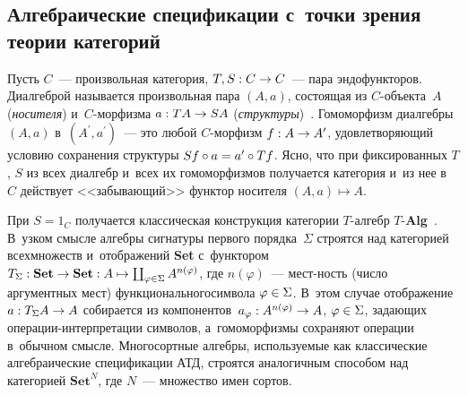 \begin{multicols}{2}
\vspace*{-6pt}

\section{Алгебраические спецификации с~точки зрения теории 
категорий}

\vspace*{-3pt}

  Пусть $C$~--- произвольная категория, $T, S : C\hm\to C$~--- пара 
эндофункторов. Ди\-ал\-геб\-рой называется произвольная пара $(A, a)$, со\-сто\-ящая 
из \mbox{$C$-объ}\-ек\-та~$A$ (\textit{носителя}) и~$C$-мор\-физ\-ма $a : TA\hm\to 
SA$ (\textit{структуры})~\cite{8-kov}. Гомоморфизм ди\-ал\-геб\-ры $(A, a)$ 
в~$(A^\prime, a^\prime)$~--- это любой $C$-мор\-физм $f : A\hm\to A^\prime$, 
удовле\-тво\-ря\-ющий условию сохранения структуры $Sf\circ a\hm= a^\prime \circ 
Tf$.  Ясно, что при фиксированных $T$, $S$ из всех ди\-ал\-гебр и~всех их 
гомоморфизмов получается категория и~из нее в~$C$ действует 
<<за\-бы\-ва\-ющий>> функ\-тор носителя $(A,a)\mapsto A$.
  
  При $S=1_C$ получается классическая конструкция категории $T$-ал\-гебр 
$T$-\textbf{Alg}~\cite[определение~5.37]{9-kov}. В~уз\-ком смыс\-ле алгебры 
сигнатуры первого порядка~$\Sigma$ строятся над категорией всех\linebreak множеств 
и~отображений \textbf{Set} с~функтором $T_\Sigma : \mathbf{Set} \hm\to 
\mathbf{Set} : A\mapsto \coprod_{\varphi\in \Sigma} A^{n(\varphi)}$, где 
$n(\varphi)$~--- мест-\linebreak ность (чис\-ло аргументных мест) функционального\linebreak символа 
$\varphi\hm\in \Sigma$. В~этом случае отображение $a : T_\Sigma A\hm\to A$ 
собирается из компонентов~$a_\varphi : A^{n(\varphi)} \hm\to A$, $\varphi\hm\in 
\Sigma$, задающих опе\-ра\-ции-ин\-тер\-пре\-та\-ции сим\-волов, а~гомоморфизмы 
сохраняют операции в~обыч\-ном смыс\-ле. Многосортные \mbox{алгебры}, ис\-поль\-зу\-емые 
как классические алгебраические \mbox{спецификации} АТД, строятся аналогичным 
способом над категорией $\mathbf{Set}^N$, где $N$~--- множество имен сортов.
  

\end{multicols}

